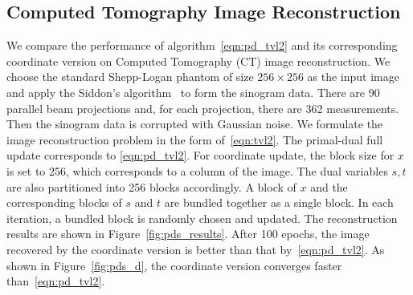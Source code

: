 \subsection{Computed Tomography Image Reconstruction}\label{sec:tv}
We compare the performance of algorithm~\eqref{eqn:pd_tvl2} and its corresponding coordinate version on Computed Tomography (CT) image reconstruction. We choose the standard Shepp-Logan phantom of size $256\times 256$ as the input image and apply the Siddon's algorithm~\cite{Siddon} to form the sinogram data. There are 90 parallel beam projections and, for each projection, there are 362 measurements. Then the sinogram data is corrupted with Gaussian noise. We formulate the image reconstruction problem in the form of~\eqref{eqn:tvl2}. The primal-dual full update corresponds to \eqref{eqn:pd_tvl2}. For coordinate update, the block size for $x$ is set to 256, which corresponds to a column of the image. The dual variables $s, t$ are also partitioned into 256 blocks accordingly. A block of $x$ and the corresponding blocks of $s$ and $t$ are bundled together as a single block. In each iteration, a bundled block is randomly chosen and updated. The reconstruction results are shown in Figure~\ref{fig:pds_results}. After 100 epochs, the image recovered by the coordinate version is better than that by~\eqref{eqn:pd_tvl2}. As shown in Figure~\ref{fig:pds_d}, the coordinate version converges faster than~\eqref{eqn:pd_tvl2}.


